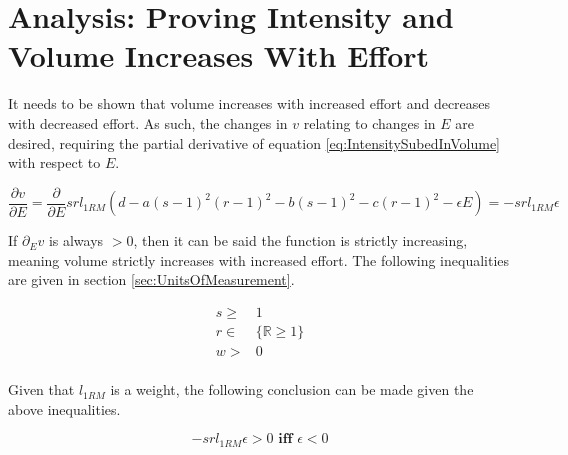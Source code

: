 

\section{Analysis: Proving Intensity and Volume Increases With Effort}
\label{sec:PotentialSurfaceVolumeIncreasesWithEffort}

It needs to be shown that volume increases with increased effort and decreases with decreased effort. As such, the changes in $v$ relating to changes in $E$ are desired, requiring the partial derivative of equation \ref{eq:IntensitySubedInVolume} with respect to $E$.

\begin{equation}
    \label{eq:VolumeEPartialDerivative}
    \frac{\partial v}{\partial E}=
    \frac{\partial}{\partial E}srl_{1RM}\left( d-a(s-1)^2(r-1)^2-b(s-1)^2-c(r-1)^2-\epsilon E \right)=-srl_{1RM}\epsilon
\end{equation}

If $\partial_{E}v$ is always $>0$, then it can be said the function is strictly increasing, meaning volume strictly increases with increased effort. The following inequalities are given in section \ref{sec:UnitsOfMeasurement}.

\begin{equation*}
    \begin{split}
        s \ge & 1 \\
        r \in & \{ \mathbb{R}\ge 1 \} \\
        w > & 0 \\
    \end{split}
\end{equation*}

Given that $l_{1RM}$ is a weight, the following conclusion can be made given the above inequalities.

\begin{equation*}
    -srl_{1RM}\epsilon> 0 \textbf{ iff } \epsilon< 0
\end{equation*}

